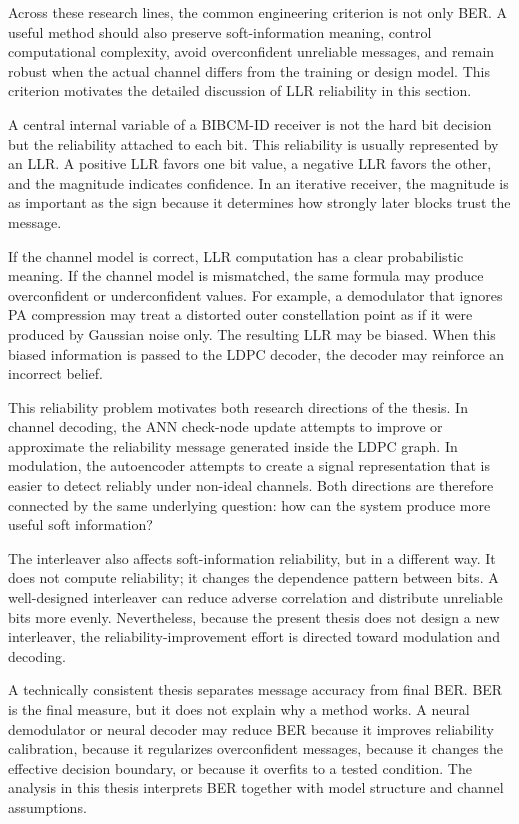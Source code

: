Across these research lines, the common engineering criterion is not only BER. A useful method should also preserve soft-information meaning, control computational complexity, avoid overconfident unreliable messages, and remain robust when the actual channel differs from the training or design model. This criterion motivates the detailed discussion of LLR reliability in this section.

A central internal variable of a BIBCM-ID receiver is not the hard bit decision but the reliability attached to each bit. This reliability is usually represented by an LLR. A positive LLR favors one bit value, a negative LLR favors the other, and the magnitude indicates confidence. In an iterative receiver, the magnitude is as important as the sign because it determines how strongly later blocks trust the message.

If the channel model is correct, LLR computation has a clear probabilistic meaning. If the channel model is mismatched, the same formula may produce overconfident or underconfident values. For example, a demodulator that ignores PA compression may treat a distorted outer constellation point as if it were produced by Gaussian noise only. The resulting LLR may be biased. When this biased information is passed to the LDPC decoder, the decoder may reinforce an incorrect belief.

This reliability problem motivates both research directions of the thesis. In channel decoding, the ANN check-node update attempts to improve or approximate the reliability message generated inside the LDPC graph. In modulation, the autoencoder attempts to create a signal representation that is easier to detect reliably under non-ideal channels. Both directions are therefore connected by the same underlying question: how can the system produce more useful soft information?

The interleaver also affects soft-information reliability, but in a different way. It does not compute reliability; it changes the dependence pattern between bits. A well-designed interleaver can reduce adverse correlation and distribute unreliable bits more evenly. Nevertheless, because the present thesis does not design a new interleaver, the reliability-improvement effort is directed toward modulation and decoding.

A technically consistent thesis separates message accuracy from final BER. BER is the final measure, but it does not explain why a method works. A neural demodulator or neural decoder may reduce BER because it improves reliability calibration, because it regularizes overconfident messages, because it changes the effective decision boundary, or because it overfits to a tested condition. The analysis in this thesis interprets BER together with model structure and channel assumptions.

